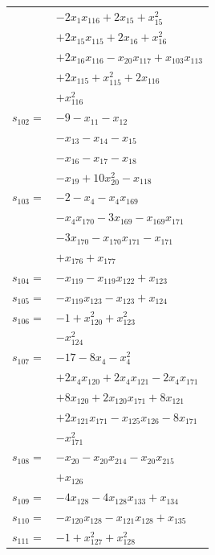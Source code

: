 \begin{longtable}{@{}r@{\;}l@{}}
 & \(\displaystyle -2x_{1}x_{116} +2x_{15} +x_{15}^{2}\) \\
 & \(\displaystyle +2x_{15}x_{115} +2x_{16} +x_{16}^{2}\) \\
 & \(\displaystyle +2x_{16}x_{116} -x_{20}x_{117} +x_{103}x_{113}\) \\
 & \(\displaystyle +2x_{115} +x_{115}^{2} +2x_{116}\) \\
 & \(\displaystyle +x_{116}^{2}\) \\[3pt]
\(s_{102}=\) & \(\displaystyle -9 -x_{11} -x_{12}\) \\
 & \(\displaystyle -x_{13} -x_{14} -x_{15}\) \\
 & \(\displaystyle -x_{16} -x_{17} -x_{18}\) \\
 & \(\displaystyle -x_{19} +10x_{20}^{2} -x_{118}\) \\[3pt]
\(s_{103}=\) & \(\displaystyle -2 -x_{4} -x_{4}x_{169}\) \\
 & \(\displaystyle -x_{4}x_{170} -3x_{169} -x_{169}x_{171}\) \\
 & \(\displaystyle -3x_{170} -x_{170}x_{171} -x_{171}\) \\
 & \(\displaystyle +x_{176} +x_{177}\) \\[3pt]
\(s_{104}=\) & \(\displaystyle -x_{119} -x_{119}x_{122} +x_{123}\) \\[3pt]
\(s_{105}=\) & \(\displaystyle -x_{119}x_{123} -x_{123} +x_{124}\) \\[3pt]
\(s_{106}=\) & \(\displaystyle -1 +x_{120}^{2} +x_{123}^{2}\) \\
 & \(\displaystyle -x_{124}^{2}\) \\[3pt]
\(s_{107}=\) & \(\displaystyle -17 -8x_{4} -x_{4}^{2}\) \\
 & \(\displaystyle +2x_{4}x_{120} +2x_{4}x_{121} -2x_{4}x_{171}\) \\
 & \(\displaystyle +8x_{120} +2x_{120}x_{171} +8x_{121}\) \\
 & \(\displaystyle +2x_{121}x_{171} -x_{125}x_{126} -8x_{171}\) \\
 & \(\displaystyle -x_{171}^{2}\) \\[3pt]
\(s_{108}=\) & \(\displaystyle -x_{20} -x_{20}x_{214} -x_{20}x_{215}\) \\
 & \(\displaystyle +x_{126}\) \\[3pt]
\(s_{109}=\) & \(\displaystyle -4x_{128} -4x_{128}x_{133} +x_{134}\) \\[3pt]
\(s_{110}=\) & \(\displaystyle -x_{120}x_{128} -x_{121}x_{128} +x_{135}\) \\[3pt]
\(s_{111}=\) & \(\displaystyle -1 +x_{127}^{2} +x_{128}^{2}\) \\

\end{longtable}
